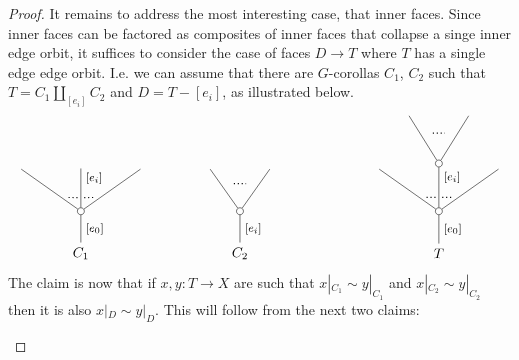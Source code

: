 \documentclass[a4paper,10pt
,draft
]{article}%
\renewcommand{\1}{\eta}%
\begin{document}
\begin{proof}
It remains to address the most interesting case,
that inner faces. Since inner faces can be factored as composites of inner faces that collapse a singe inner edge orbit,
it suffices to consider the case of faces
$D \to T$ where $T$ has a single edge edge orbit.
I.e. we can assume that there are $G$-corollas
$C_1$, $C_2$ such that 
$T = C_1 \amalg_{[e_i]} C_2$ and
$D = T - [e_i]$, as illustrated below.
\[
\begin{tikzpicture}
[grow=up,auto,level distance=3em,
every node/.style = {font=\footnotesize},
dummy/.style={circle,draw,inner sep=0pt,minimum size=1.75mm}]
	\node at (0,0) [font=\normalsize]{$C_1$}
		child{node [dummy] {}
			child{
			edge from parent node [swap,near end] {} node [near start,inner sep=1pt,name=Kn] {}}
			child[level distance=3.4em]{node {}
			edge from parent node [near end,swap] {$[e_i]$}
node [near start,inner sep=1pt,name=Kone,swap] {}
node [near start,inner sep=1pt,name=Kone1] {}}
			child{
			edge from parent node [near end] {}
node [swap] {}
node [near start,inner sep=1pt,name=Kn1,swap]{}}
		edge from parent node [swap] {$[e_0]$}
		};
		\draw [dotted,thick] (Kone) -- (Kn) ;
		\draw [dotted,thick] (Kone1) -- (Kn1) ;
	\node at (4,0) [font=\normalsize]{$C_2$}
		child{node [dummy] {}
			child{
			edge from parent node [swap,near end] {} node [name=Kn] {}}
			child{
			edge from parent node [near end] {}
node [name=Kone,swap] {}}
		edge from parent node [swap] {$[e_i]$}
		};
		\draw [dotted,thick] (Kone) -- (Kn) ;
	\node at (9,0) [font=\normalsize]{$T$}
		child{node [dummy] {}
			child{
			edge from parent node [swap,near end] {} node [near start,inner sep=1pt,name=Kn] {}}
			child[level distance=3.4em]{node [dummy] {}
				child{
				edge from parent node [swap,near end] {} node [name=Kn2] {}}
				child{
				edge from parent node [near end] {}
node [name=Kone2,swap] {}}
			edge from parent node [near end,swap] {$[e_i]$}
node [near start,inner sep=1pt,name=Kone,swap] {}
node [near start,inner sep=1pt,name=Kone1] {}}
			child{
			edge from parent node [near end] {}
node [swap] {}
node [near start,inner sep=1pt,name=Kn1,swap]{}}
		edge from parent node [swap] {$[e_0]$}
		};
		\draw [dotted,thick] (Kone) -- (Kn) ;
		\draw [dotted,thick] (Kone1) -- (Kn1) ;
		\draw [dotted,thick] (Kone2) -- (Kn2) ;
\end{tikzpicture}
\]
The claim is now that if
$x,y \colon T \to X$ are such that
$x|_{C_1} \sim y|_{C_1}$ and
$x|_{C_2} \sim y|_{C_2}$
then it is also 
$x|_{D} \sim y|_{D}$.
This will follow from the next two claims:
\begin{itemize}

\end{itemize}
\end{proof}
\end{document}
